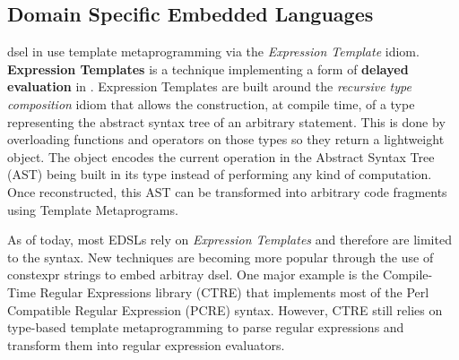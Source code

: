 \documentclass[../main]{subfiles}
\begin{document}
%



\subsection{
  \cpp Domain Specific Embedded Languages
}

\gls{dsel}\acrpluralsuffix{} in \cpp use template metaprogramming via the \textit{Expression
Template} idiom.
\textbf{Expression Templates} \cite{veldhuizen:1995,vandevoorde:2002} is a
technique implementing a form of \textbf{delayed evaluation} in
\cpp \cite{spinellis:2001}. Expression Templates are built around the
\textit{recursive type composition} idiom \cite{jarvi:1998} that allows the
construction, at compile time, of a type representing the abstract syntax tree
of an arbitrary statement. This is done by overloading functions and operators
on those types so they return a lightweight object.
The object encodes the current operation in the Abstract Syntax Tree
(AST) being built in its type instead of performing any kind of computation.
Once reconstructed, this AST can be transformed into arbitrary code fragments
using Template Metaprograms.

As of today, most \cpp EDSLs rely on \textit{Expression Templates} and therefore
are limited to the \cpp syntax. New techniques are becoming more popular through
the use of \gls{constexpr} strings to embed arbitray \gls{dsel}\acrpluralsuffix{}. One major example is
the Compile-Time Regular Expressions library (CTRE) \cite{ctre} that implements
most of the Perl Compatible Regular Expression (PCRE) syntax. However, CTRE
still relies on type-based template metaprogramming to parse regular expressions
and transform them into regular expression evaluators.


\end{document}
